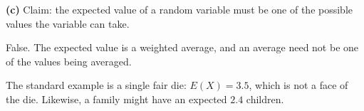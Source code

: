 \documentclass[12pt]{ximera}
\begin{document}
\begin{problem}
\begin{prompt}
\textbf{(c)} Claim: the expected value of a random variable must be one of the
possible values the variable can take.

\begin{multipleChoice}
\end{multipleChoice}

\begin{feedback}
False. The expected value is a weighted average, and an average need not be one of
the values being averaged.

The standard example is a single fair die: $E(X)=3.5$, which is not a face of the
die. Likewise, a family might have an expected $2.4$ children.
\end{feedback}
\end{prompt}
\end{problem}
\end{document}
